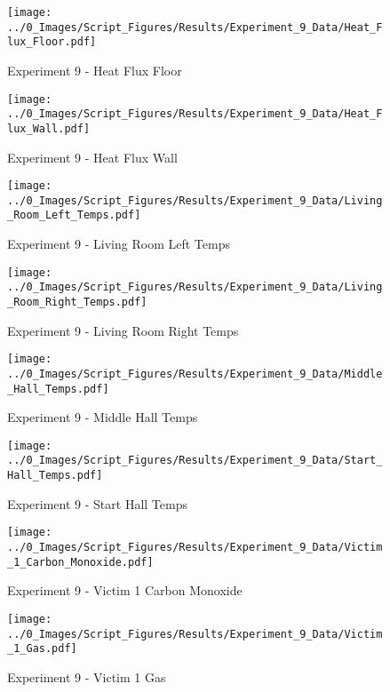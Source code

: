	\clearpage

	\begin{figure}[H]
		\centering
		\texttt{[image: ../0\_Images/Script\_Figures/Results/Experiment\_9\_Data/Heat\_Flux\_Floor.pdf]}
		\caption[]{Experiment 9 - Heat Flux Floor}
	\end{figure}
 

	\begin{figure}[H]
		\centering
		\texttt{[image: ../0\_Images/Script\_Figures/Results/Experiment\_9\_Data/Heat\_Flux\_Wall.pdf]}
		\caption[]{Experiment 9 - Heat Flux Wall}
	\end{figure}
 
	\clearpage

	\begin{figure}[H]
		\centering
		\texttt{[image: ../0\_Images/Script\_Figures/Results/Experiment\_9\_Data/Living\_Room\_Left\_Temps.pdf]}
		\caption[]{Experiment 9 - Living Room Left Temps}
	\end{figure}
 

	\begin{figure}[H]
		\centering
		\texttt{[image: ../0\_Images/Script\_Figures/Results/Experiment\_9\_Data/Living\_Room\_Right\_Temps.pdf]}
		\caption[]{Experiment 9 - Living Room Right Temps}
	\end{figure}
 
	\clearpage

	\begin{figure}[H]
		\centering
		\texttt{[image: ../0\_Images/Script\_Figures/Results/Experiment\_9\_Data/Middle\_Hall\_Temps.pdf]}
		\caption[]{Experiment 9 - Middle Hall Temps}
	\end{figure}
 

	\begin{figure}[H]
		\centering
		\texttt{[image: ../0\_Images/Script\_Figures/Results/Experiment\_9\_Data/Start\_Hall\_Temps.pdf]}
		\caption[]{Experiment 9 - Start Hall Temps}
	\end{figure}
 
	\clearpage

	\begin{figure}[H]
		\centering
		\texttt{[image: ../0\_Images/Script\_Figures/Results/Experiment\_9\_Data/Victim\_1\_Carbon\_Monoxide.pdf]}
		\caption[]{Experiment 9 - Victim 1 Carbon Monoxide}
	\end{figure}
 

	\begin{figure}[H]
		\centering
		\texttt{[image: ../0\_Images/Script\_Figures/Results/Experiment\_9\_Data/Victim\_1\_Gas.pdf]}
		\caption[]{Experiment 9 - Victim 1 Gas}
	\end{figure}
 
